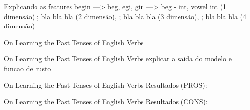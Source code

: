 \documentclass[10pt]{beamer}
\begin{document}
\begin{frame}[fragile]{Explicando as features}
 begin ---> beg, egi, gin ---> beg - int, vowel int (1 dimensão) ; bla bla bla (2 dimensão), ; bla bla bla (3 dimensão), ; bla bla bla (4 dimensão) 

\end{frame}



\begin{frame}[fragile]{On Learning the Past Tenses of English Verbs}

\end{frame}

% 


\begin{frame}[fragile]{On Learning the Past Tenses of English Verbs}
explicar a saida do modelo e funcao de custo
\end{frame}


\begin{frame}[fragile]{On Learning the Past Tenses of English Verbs}
Resultados (PROS):

\begin{itemize}
\end{itemize}
\end{frame}

\begin{frame}[fragile]{On Learning the Past Tenses of English Verbs}
Resultados (CONS):

\begin{itemize}
\end{itemize}
\end{frame}
\end{document}
